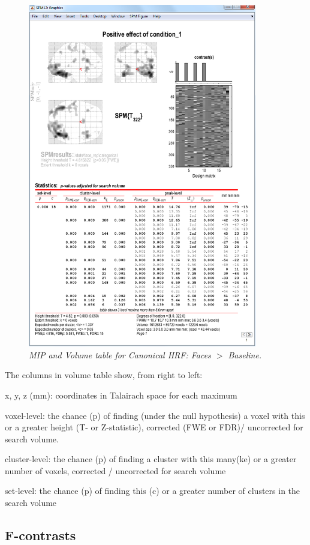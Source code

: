 \begin{figure}
\begin{center}
\includegraphics[width=100mm]{faces/cat5_volume}
\caption{\em MIP and Volume table for Canonical HRF: Faces  $>$ Baseline. \label{cat5_volume} }
\end{center}
\end{figure}

The columns in volume table show, from right to left:

\bi
\item{x, y, z (mm): coordinates in Talairach space for each maximum}
\item{voxel-level: the chance (p) of finding (under the null hypothesis) a voxel with this or a greater height (T- or Z-statistic), corrected (FWE or FDR)/ uncorrected for search volume.}
\item{cluster-level: the chance (p) of finding a cluster with this many(ke) or a greater number of voxels, corrected / uncorrected for search volume}
\item{set-level: the chance (p) of finding this (c) or a greater number of clusters in the search volume}
\ei

\subsection{F-contrasts}

